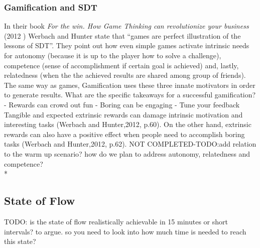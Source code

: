 \subsubsection{Gamification and SDT}
In their book \textit{For the win. How Game Thinking can revolutionize your business} (2012 )\cite{werbach2012win} Werbach and Hunter state that ``games are perfect illustration of the lessons of SDT''. They point out how even simple games activate intrinsic needs for autonomy (because it is up to the player how to solve a challenge), competence (sense of accomplishment if certain goal is achieved) and, lastly, relatedness (when the the achieved results are shared among group of friends). The same way as games, Gamification uses these three innate motivators in order to generate results.
What are the specific takeaways for a successful gamification?
- Rewards can crowd out fun
- Boring can be engaging
- Tune your feedback
Tangible and expected extrinsic rewards can damage intrinsic motivation and interesting tasks (Werbach and Hunter,2012, p.60). On the other hand, extrinsic rewards can also have a positive effect when people need to accomplish boring
tasks (Werbach and Hunter,2012, p.62).
NOT COMPLETED-TODO:add relation to the warm up scenario? how do we plan to address autonomy, relatedness and competence? 
\\*

\subsection{State of Flow}
TODO: is the state of flow realistically achievable in 15 minutes or short intervals? to argue. so you need to look into how much time is needed to reach this state?

